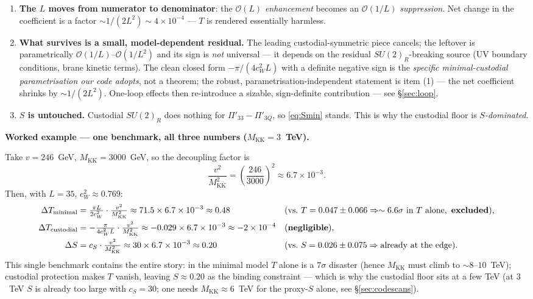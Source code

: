 \documentclass[11pt]{article}
\newenvironment{callout}[1]{%
  \par\medskip\begin{shaded}\noindent\textbf{#1}\par\smallskip}{\end{shaded}\medskip}
\newcommand{\MKK}{M_{\mathrm{KK}}}
\newcommand{\cwsq}{c_W^2}
\newcommand{\Pibig}{\Pi}
\newcommand{\vev}{v}
\newcommand{\SUR}{SU(2)_R}
\theoremstyle{definition}
\begin{document}
\begin{enumerate}[leftmargin=1.6em]
\item \textbf{The $L$ moves from numerator to denominator}: the
$\mathcal{O}(L)$ \emph{enhancement} becomes an $\mathcal{O}(1/L)$
\emph{suppression}. Net change in the coefficient is a factor
$\sim 1/(2L^2)\sim 4\times10^{-4}$ --- $T$ is rendered essentially harmless.
\item \textbf{What survives is a small, model-dependent residual.} The leading
custodial-symmetric piece cancels; the leftover is parametrically
$\mathcal{O}(1/L)$--$\mathcal{O}(1/L^2)$ and its sign is \emph{not} universal ---
it depends on the residual $\SUR$-breaking source (UV boundary conditions, brane
kinetic terms). The clean closed form $-\pi/(4\cwsq L)$ with a definite negative
sign is the \emph{specific minimal-custodial parametrisation our code adopts},
not a theorem; the robust, parametrisation-independent statement is item (1) ---
the net coefficient shrinks by $\sim 1/(2L^2)$. One-loop effects then re-introduce
a sizable, sign-definite contribution --- see \S\ref{sec:loop}.
\item \textbf{$S$ is untouched.} Custodial $\SUR$ does nothing for
$\Pibig'_{33}-\Pibig'_{3Q}$, so \eqref{eq:Smin} stands. This is why the custodial
floor is \emph{$S$-dominated}.
\end{enumerate}
\begin{callout}{Worked example --- one benchmark, all three numbers ($\MKK = 3$~TeV).}
Take $\vev = 246$~GeV, $\MKK = 3000$~GeV, so the decoupling factor is
\[
\frac{\vev^2}{\MKK^2} = \left(\frac{246}{3000}\right)^2 \approx 6.7\times10^{-3}.
\]
Then, with $L=35$, $\cwsq\approx0.769$:
\begin{align*}
\Delta T_{\rm minimal}  &= \tfrac{\pi L}{2\cwsq}\cdot\tfrac{\vev^2}{\MKK^2}
   \approx 71.5\times 6.7\times10^{-3} \approx 0.48
   &&(\text{vs.\ }T=0.047\pm0.066 \Rightarrow \sim 6.6\sigma\text{ in }T\text{ alone},\ \textbf{excluded}),\\
\Delta T_{\rm custodial} &= -\tfrac{\pi}{4\cwsq L}\cdot\tfrac{\vev^2}{\MKK^2}
   \approx -0.029\times 6.7\times10^{-3} \approx -2\times10^{-4}
   &&(\textbf{negligible}),\\
\Delta S &= c_S\cdot\tfrac{\vev^2}{\MKK^2}
   \approx 30\times 6.7\times10^{-3} \approx 0.20
   &&(\text{vs.\ }S=0.026\pm0.075 \Rightarrow \text{already at the edge}).
\end{align*}
This single benchmark contains the entire story: in the minimal model $T$ alone
is a $7\sigma$ disaster (hence $\MKK$ must climb to $\sim 8$--$10$~TeV); custodial
protection makes $T$ vanish, leaving $S\approx0.20$ as the binding constraint ---
which is why the custodial floor sits at a few TeV (at $3$~TeV $S$ is already too
large with $c_S=30$; one needs $\MKK\approx 6$~TeV for the proxy-$S$ alone, see
\S\ref{sec:codescans}).
\end{callout}
\end{document}
